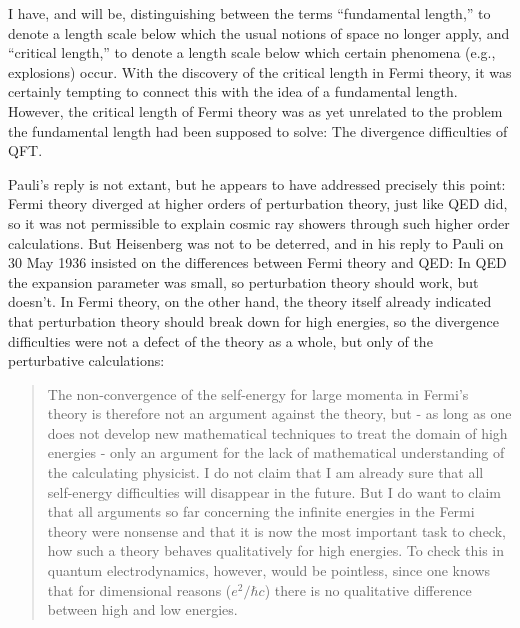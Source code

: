 \documentclass[12pt]{article}
\begin{document}
I have, and will be, distinguishing between the terms ``fundamental length,'' to denote a length scale below which the usual notions of space no longer apply, and ``critical length,'' to denote a length scale below which certain phenomena (e.g., explosions) occur. With the discovery of the critical length in Fermi theory, it was certainly tempting to connect this with the idea of a fundamental length. However, the critical length of Fermi theory was as yet unrelated to the problem the fundamental length had been supposed to solve: The divergence difficulties of QFT.

Pauli's reply is not extant, but he appears to have addressed precisely this point: Fermi theory diverged at higher orders of perturbation theory, just like QED did, so it was not permissible to explain cosmic ray showers through such higher order calculations. But Heisenberg was not to be deterred, and in his reply to Pauli on 30 May 1936 insisted on the differences between Fermi theory and QED: In QED the expansion parameter was small, so perturbation theory should work, but doesn't. In Fermi theory, on the other hand, the theory itself already indicated that perturbation theory should break down for high energies, so the divergence difficulties were not a defect of the theory as a whole, but only of the perturbative calculations:

\begin{quote}
The non-convergence of the self-energy for large momenta in Fermi's theory is therefore not an argument against the theory, but - as long as one does not develop new mathematical techniques to treat the domain of high energies - only an argument for the lack of mathematical understanding of the calculating physicist. I do not claim that I am already sure that all self-energy difficulties will disappear in the future. But I do want to claim that all arguments so far concerning the infinite energies in the Fermi theory were nonsense and that it is now the most important task to check, how such a theory behaves qualitatively for high energies. To check this in quantum electrodynamics, however, would be pointless, since one knows that for dimensional reasons ($e^2/\hbar c$) there is no qualitative difference between high and low energies.
\end{quote} 
\end{document}
